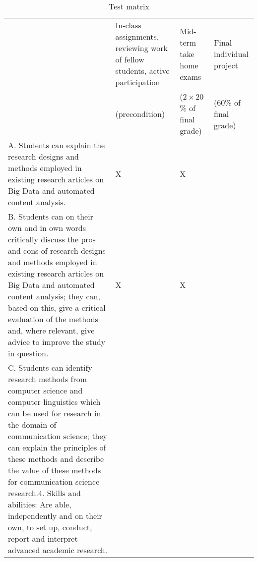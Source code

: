 \documentclass[a4paper,12pt]{report}
\begin{document}
\begin{table}[]
\footnotesize{
\centering
\caption{Test matrix}
\label{testmatrix}
\begin{tabular}{p{8cm}p{2cm}p{2cm}p{2cm}}
                                                                                                                                                                                                                                                                                                                                                                                            & In-class assignments, reviewing work of fellow students, active participation  
& Mid-term take home exams 
& Final individual project \\
                                                                                                                                                                                                                                                                                                                                                                                                                   &  (precondition)                                                                                            & ($2 \times 20$\% of final grade)   & (60\% of final grade)    \\
A. Students can explain the research designs and methods employed in existing research articles on Big Data and automated content analysis.                                                                                                                                                                                                                      & X                                                                                            & X                       &                          \\
B. Students can on their own and in own words critically discuss the pros and cons of research designs and methods employed in existing research articles on Big Data and automated content analysis; they can, based on this, give a critical evaluation of the methods and, where relevant, give advice to improve the study in question.
& X                                                                                            & X                       &                          \\
C. Students can identify research methods from computer science and computer linguistics which can be used for research in the domain of communication science; they can explain the principles of these methods and describe the value of these methods for communication science research.4. Skills and abilities: Are able, independently and on their own, to set up, conduct, report and interpret advanced academic research.

\end{tabular}}
\end{table}
\end{document}
